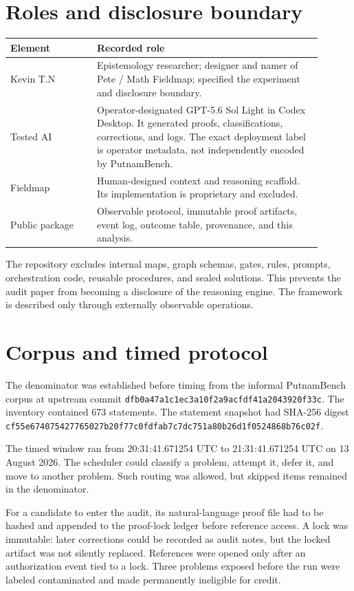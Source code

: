 \documentclass[10pt]{article}
\newcommand{\status}[1]{\texttt{#1}}
\begin{document}
\section{Roles and disclosure boundary}
\begin{center}\small
\begin{tabular}{p{0.25\linewidth}p{0.65\linewidth}}
\toprule
Element & Recorded role\\\midrule
Kevin T.N & Epistemology researcher; designer and namer of Pete / Math Fieldmap; specified the experiment and disclosure boundary.\\
Tested AI & Operator-designated GPT-5.6 Sol Light in Codex Desktop. It generated proofs, classifications, corrections, and logs. The exact deployment label is operator metadata, not independently encoded by PutnamBench.\\
Fieldmap & Human-designed context and reasoning scaffold. Its implementation is proprietary and excluded.\\
Public package & Observable protocol, immutable proof artifacts, event log, outcome table, provenance, and this analysis.\\
\bottomrule
\end{tabular}
\end{center}

The repository excludes internal maps, graph schemas, gates, rules, prompts, orchestration code, reusable procedures, and sealed solutions. This prevents the audit paper from becoming a disclosure of the reasoning engine. The framework is described only through externally observable operations.

\section{Corpus and timed protocol}
The denominator was established before timing from the informal PutnamBench corpus at upstream commit
\status{dfb0a47a1c1ec3a10f2a9acfdf41a2043920f33c}. The inventory contained 673 statements. The statement snapshot had SHA-256 digest
\status{cf55e674075427765027b20f77c0fdfab7c7dc751a80b26d1f0524868b76c02f}.

The timed window ran from 20:31:41.671254 UTC to 21:31:41.671254 UTC on 13 August 2026. The scheduler could classify a problem, attempt it, defer it, and move to another problem. Such routing was allowed, but skipped items remained in the denominator.

For a candidate to enter the audit, its natural-language proof file had to be hashed and appended to the proof-lock ledger before reference access. A lock was immutable: later corrections could be recorded as audit notes, but the locked artifact was not silently replaced. References were opened only after an authorization event tied to a lock. Three problems exposed before the run were labeled contaminated and made permanently ineligible for credit.
\end{document}
